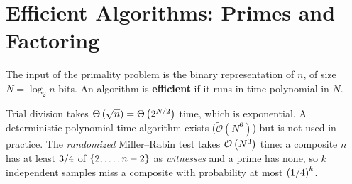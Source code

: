 
\section{Efficient Algorithms: Primes and Factoring}

%
%
The input of the primality problem is the binary representation of $n$, of size $N = \log_2 n$
bits. An algorithm is \textbf{efficient} if it runs in time polynomial in $N$.

Trial division takes $\Theta\left(\sqrt{n}\right) = \Theta\left(2^{N/2}\right)$ time, which is exponential. A deterministic
polynomial-time algorithm exists ($\tilde{\mathcal{O}}(N^{6})$) but is not used in practice. The
\emph{randomized} Miller--Rabin test takes $\mathcal{O}\left(N^3\right)$ time: a composite $n$ has at least
$3/4$ of $\left\lbrace2, \dots, n-2\right\rbrace$ as \emph{witnesses} and a prime has none, so $k$ independent
samples miss a composite with probability at most $\left(1/4\right)^k$.

